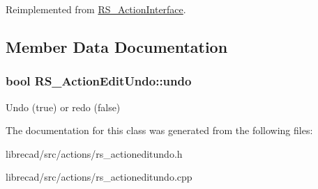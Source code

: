 Reimplemented from \hyperlink{classRS__ActionInterface_aa2ba8f6f697f735eace4ec5449c0b8cd}{R\-S\-\_\-\-Action\-Interface}.



\subsection{Member Data Documentation}
\hypertarget{classRS__ActionEditUndo_a0c6bc1f9d62c298e08880c2764e0e73f}{
\subsubsection[{undo}]{\setlength{\rightskip}{0pt plus 5cm}bool R\-S\-\_\-\-Action\-Edit\-Undo\-::undo\hspace{0.3cm}{\ttfamily [protected]}}}\label{classRS__ActionEditUndo_a0c6bc1f9d62c298e08880c2764e0e73f}
Undo (true) or redo (false) 

The documentation for this class was generated from the following files\-:\begin{DoxyCompactItemize}
\item 
librecad/src/actions/rs\-\_\-actioneditundo.\-h\item 
librecad/src/actions/rs\-\_\-actioneditundo.\-cpp\end{DoxyCompactItemize}
